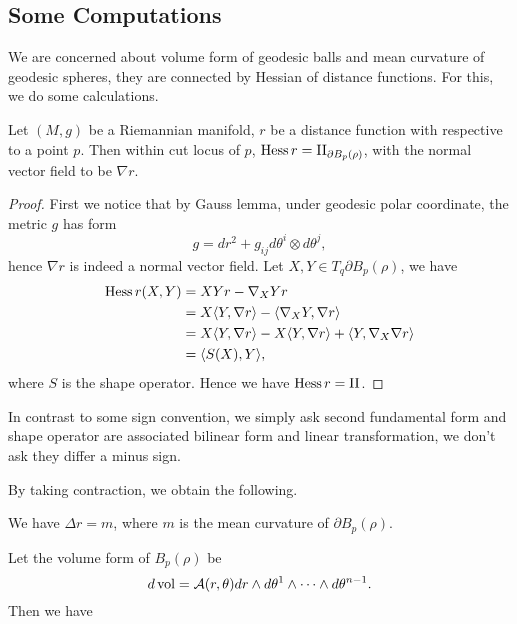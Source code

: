 \subsection{Some Computations}

We are concerned about volume form of geodesic balls and mean curvature of geodesic spheres, they are connected by Hessian of distance functions.
For this, we do some calculations.

\begin{lem}
    Let $(M,g)$ be a Riemannian manifold, $r$ be a distance function with respective to a point $p$.
    Then within cut locus of $p$, $\operatorname{Hess}{r}=\operatorname{II}_{\partial B_p(\rho)}$, with the normal vector field to be $\nabla r$.
\end{lem}
\begin{proof}
    First we notice that by Gauss lemma, under geodesic polar coordinate, the metric $g$ has form
    \[g=dr^2+g_{ij}d\theta^i\otimes d\theta^j,\]
    hence $\nabla r$ is indeed a normal vector field.
    Let $X,Y\in T_{q}\partial B_p(\rho)$, we have
    \begin{align*}
        \operatorname{Hess}{r}(X,Y)&=XYr-\nabla_XYr\\
        &=X\langle Y,\nabla r\rangle-\langle\nabla_XY,\nabla r\rangle\\
        &=X\langle Y,\nabla r\rangle-X\langle Y,\nabla r\rangle+\langle Y,\nabla_X\nabla r\rangle\\
        &=\langle S(X),Y\rangle,
    \end{align*}
    where $S$ is the shape operator.
    Hence we have $\operatorname{Hess}{r}=\operatorname{II}$.
\end{proof}

\begin{rem}
    In contrast to some sign convention, we simply ask second fundamental form and shape operator are associated bilinear form and linear transformation, we don't ask they differ a minus sign.
\end{rem}

By taking contraction, we obtain the following.
\begin{cor}\label{cor:Delta r=m}
    We have $\Delta r=m$, where $m$ is the mean curvature of $\partial B_p(\rho)$.
\end{cor}

Let the volume form of $B_p(\rho)$ be
\begin{equation}
    d\operatorname{vol}=\mathcal{A}(r,\theta)dr\wedge d\theta^1\wedge\cdots\wedge d\theta^{n-1}.\label{eq:volume form}
\end{equation}
Then we have


